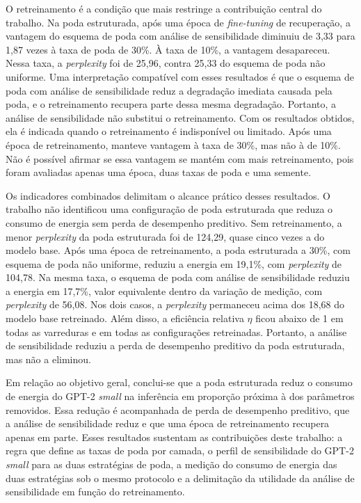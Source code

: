 O retreinamento é a condição que mais restringe a contribuição central do trabalho. Na poda
estruturada, após uma época de \textit{fine-tuning} de recuperação, a vantagem do esquema de
poda com análise de sensibilidade diminuiu de 3,33 para 1,87 vezes à taxa de poda de 30\%. À
taxa de 10\%, a vantagem desapareceu. Nessa taxa, a \textit{perplexity} foi de 25,96, contra
25,33 do esquema de poda não uniforme. Uma interpretação
compatível com esses resultados é que o esquema de poda com análise de sensibilidade reduz a
degradação imediata causada pela poda, e o retreinamento recupera parte dessa mesma degradação.
Portanto, a análise de sensibilidade não substitui o retreinamento. Com os resultados obtidos,
ela é indicada quando o retreinamento é indisponível ou limitado. Após uma época de
retreinamento, manteve vantagem à taxa de 30\%, mas não à de 10\%. Não é possível afirmar se
essa vantagem se mantém com mais retreinamento, pois foram avaliadas apenas uma época, duas
taxas de poda e uma semente.

Os indicadores combinados delimitam o alcance prático desses resultados. O trabalho não
identificou uma configuração de poda estruturada que reduza o consumo de energia sem perda de
desempenho preditivo. Sem retreinamento, a menor \textit{perplexity} da poda estruturada foi de
124,29, quase cinco vezes a do modelo base. Após uma época de retreinamento, a poda estruturada
a 30\%, com esquema de poda não uniforme, reduziu a energia em 19,1\%, com \textit{perplexity}
de 104,78. Na mesma taxa, o esquema de poda com análise de sensibilidade reduziu a energia em
17,7\%, valor equivalente dentro da variação de medição, com \textit{perplexity} de 56,08. Nos
dois casos, a \textit{perplexity} permaneceu acima dos 18,68 do modelo base retreinado. Além
disso, a eficiência relativa $\eta$ ficou abaixo de 1 em todas as varreduras e em todas as
configurações retreinadas. Portanto, a análise de sensibilidade
reduziu a perda de desempenho preditivo da poda estruturada, mas não a eliminou.

Em relação ao objetivo geral, conclui-se que a poda estruturada reduz o consumo de energia do
GPT-2 \textit{small} na inferência em proporção próxima à dos parâmetros removidos. Essa
redução é acompanhada de perda de desempenho preditivo, que a análise de sensibilidade reduz e
que uma época de retreinamento recupera apenas em parte. Esses resultados sustentam as
contribuições deste trabalho: a regra que define as taxas de
poda por camada, o perfil de sensibilidade do GPT-2 \textit{small} para as duas estratégias de
poda, a medição do consumo de energia das duas estratégias sob o mesmo protocolo e a
delimitação da utilidade da análise de sensibilidade em função do retreinamento.

